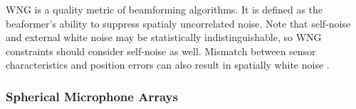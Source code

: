 

WNG is a quality metric of beamforming algorithms. It is defined as the beaformer's ability to suppress spatialy uncorrelated noise. Note that self-noise and external white noise may be statistically indistinguishable, so WNG constraints should consider self-noise as well. Mismatch between sensor characteristics and position errors can also result in spatially white noise \cite{mabande2009design}. 




\subsubsection{Spherical Microphone Arrays}


